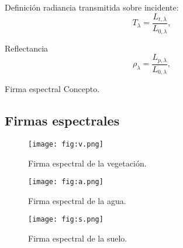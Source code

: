 \begin{frame}{}
    \begin{block}{Definición}
       radiancia transmitida sobre incidente:
        \begin{equation}
         T_\lambda = \frac{L_{t,\lambda}}{L_{0,\lambda}} ,
        \end{equation}
         \end{block}
\end{frame}








\begin{frame}{}
    \begin{block}{Reflectancia}
               \begin{equation}
         \rho_\lambda = \frac{L_{p,\lambda}}{L_{0,\lambda}} ,
        \end{equation}
         \end{block}
\end{frame}

\begin {frame}
\begin{block}{Firma espectral}
      Concepto.
               \end{block}
\end{frame}

\subsection{Firmas espectrales}

\begin{frame}{}
  \begin{figure}
    \centering
    \texttt{[image: fig:v.png]}
    \caption{Firma espectral de la vegetación.}
    \label{}
  \end{figure}
\end{frame}

\begin{frame}{}
  \begin{figure}
    \centering
    \texttt{[image: fig:a.png]}
    \caption{Firma espectral de la agua.}
    \label{}
  \end{figure}
\end{frame}

\begin{frame}{}
  \begin{figure}
    \centering
    \texttt{[image: fig:s.png]}
    \caption{Firma espectral de la suelo.}
    \label{}
  \end{figure}
\end{frame}

